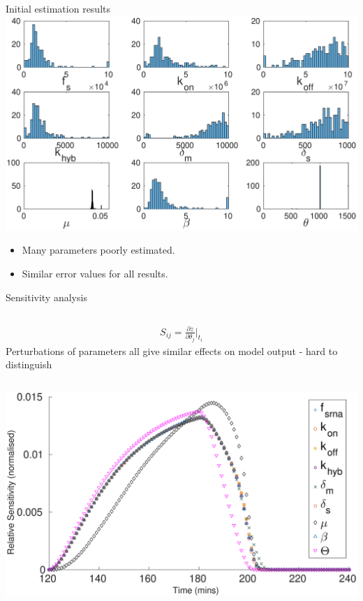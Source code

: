 \documentclass{beamer}
\begin{document}
\begin{frame}{Initial estimation results}
  \includegraphics[scale = 0.27, clip = true, trim = 130 0 0 50]{Figures/13_9_hist}
  \vspace{-10mm}
        \begin{itemize}
            \item Many parameters poorly estimated.
    \item Similar error values for all results.
            \end{itemize}
\end{frame}

\begin{frame}{Sensitivity analysis}
\begin{columns}
 \LARGE
\begin{align*}
S_{ij} =  \frac{\partial z}{ \partial \theta_{j}}\Bigr|_{t_{i}}
\end{align*}
\normalsize
{}
Perturbations of parameters all give similar effects on model output - \alert{hard to distinguish}
\end{columns}
  \includegraphics[scale = 0.25, clip = true, trim = 00 0 0 0]{Figures/Sensitivty_scaled_other}
\end{frame}
\end{document}
